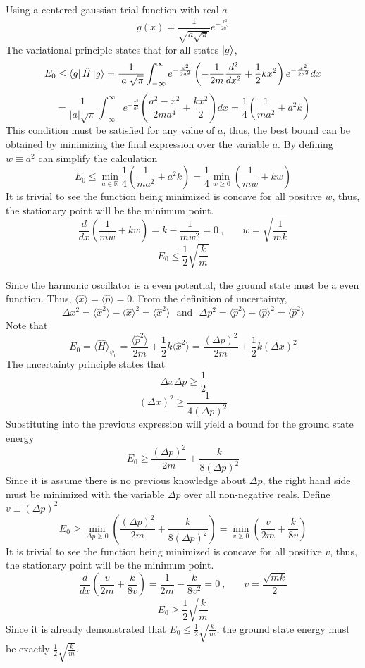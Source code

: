 \begin{sol}
Using a centered gaussian trial function with real $a$ $$g(x)=\frac{1}{\sqrt{a\sqrt{\pi}}}e^{-\frac{x^2}{2a^2}}$$
The variational principle states that for all states $\ket g$,
$$E_0\leq\bra{g}\hat H\ket{g}=\frac{1}{|a|\sqrt\pi}\int_{-\infty}^\infty e^{-\frac{x^2}{2a^2}}\left(-\frac{1}{2m}\frac{d^2}{dx^2}+\frac{1}{2}kx^2\right)e^{-\frac{x^2}{2a^2}}dx$$
$$=\frac{1}{|a|\sqrt\pi}\int_{-\infty}^\infty e^{-\frac{x^2}{a^2}}\left(\frac{a^2-x^2}{2ma^4}+\frac{kx^2}{2}\right)dx=\frac{1}{4}\left(\frac{1}{ma^2}+a^2k\right)$$
This condition must be satisfied for any value of $a$, thus, the best bound can be obtained by minimizing the final expression over the variable $a$. By defining $w\equiv a^2$ can simplify the calculation
$$E_0\leq\min_{a\in\mathbb R}\frac{1}{4}\left(\frac{1}{ma^2}+a^2k\right)=\frac{1}{4}\min_{w\geq 0 }\left(\frac{1}{mw}+kw\right)$$
It is trivial to see the function being minimized is concave for all positive $w$, thus, the stationary point will be the minimum point.
$$\frac{d}{dx}\left(\frac{1}{mw}+kw\right)=k-\frac{1}{mw^2}=0\:,\:\:\:\:\:\:\:\:w=\sqrt{\frac{1}{mk}}$$
$$E_0\leq \frac{1}{2}\sqrt{\frac{k}{m}}$$


Since the harmonic oscillator is a even potential, the ground state must be a even function. Thus, $\langle \hat x\rangle=\langle\hat p\rangle=0$. From the definition of uncertainty, 
$$\Delta x^2=\langle \hat x^2\rangle-\langle \hat x\rangle^2=\langle \hat x^2\rangle\,\,\text{      and      }\,\,\Delta p^2=\langle \hat p^2\rangle-\langle \hat p\rangle^2=\langle \hat p^2\rangle$$
Note that $$E_0=\langle \hat{H}\rangle_{\psi_0}=\frac{\langle \hat p^2\rangle}{2m}+\frac{1}{2}k\langle \hat x^2\rangle=\frac{(\Delta p)^2}{2m}+\frac{1}{2}k(\Delta x)^2$$
The uncertainty principle states that
$$\Delta x\Delta p\geq\frac{1}{2}$$
$$(\Delta x)^2\geq\frac{1}{4(\Delta p)^2}$$
Substituting into the previous expression will yield a bound for the ground state energy
$$E_0\geq\frac{(\Delta p)^2}{2m}+\frac{k}{8(\Delta p)^2}$$
Since it is assume there is no previous knowledge about $\Delta p$, the right hand side must be minimized with the variable $\Delta p$ over all non-negative reals. Define $v\equiv(\Delta p)^2$
$$E_0\geq\min_{\Delta p\geq 0}\left(\frac{(\Delta p)^2}{2m}+\frac{k}{8(\Delta p)^2}\right)=\min_{v\geq 0}\left(\frac{v}{2m}+\frac{k}{8v}\right)$$
It is trivial to see the function being minimized is concave for all positive $v$, thus, the stationary point will be the minimum point.
$$\frac{d}{dx}\left(\frac{v}{2m}+\frac{k}{8v}\right)=\frac{1}{2m}-\frac{k}{8v^2}=0\:,\:\:\:\:\:\:\:\:v=\frac{\sqrt{mk}}{2}$$
$$E_0\geq\frac{1}{2}\sqrt{\frac{k}{m}}$$
Since it is already demonstrated that $\displaystyle{E_0\leq \frac{1}{2}\sqrt{\frac{k}{m}}}$, the ground state energy must be exactly $\displaystyle{\frac{1}{2}\sqrt{\frac{k}{m}}}$.
\end{sol}